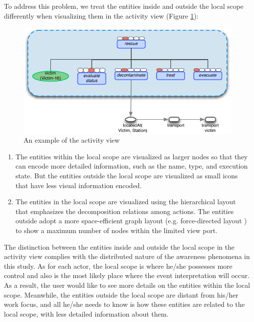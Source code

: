 To address this problem, we treat the entities inside and outside the local scope differently when visualizing them in the activity view (Figure \ref{fig:activity_view}):
\begin{figure}[htbp] %
	\centering
	\includegraphics{activity_view.pdf} 
	\caption{An example of the activity view}
	\label{fig:activity_view}
\end{figure}

\begin{enumerate}
	\item The entities within the local scope are visualized as larger nodes so that they can encode more detailed information, such as the name, type, and execution state. But the entities outside the local scope are visualized as small icons that have less visual information encoded. 
	\item The entities in the local scope are visualized using the hierarchical layout that emphasizes the decomposition relations among actions. The entities outside adopt a more space-efficient graph layout (e.g. force-directed layout \cite{Fruchterman1991}) to show a maximum number of nodes within the limited view port.
\end{enumerate}

The distinction between the entities inside and outside the local scope in the activity view complies with the distributed nature of the awareness phenomena in this study. As for each actor, the local scope is where he/she possesses more control and also is the most likely place where the event interpretation will occur. As a result, the user would like to see more details on the entities within the local scope. Meanwhile, the entities outside the local scope are distant from his/her work focus, and all he/she needs to know is how these entities are related to the local scope, with less detailed information about them.

